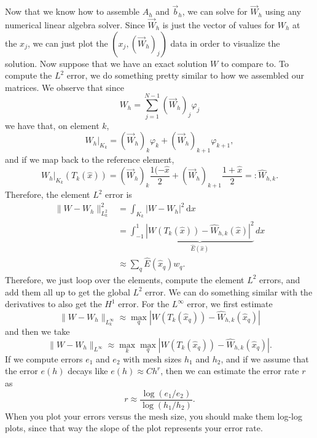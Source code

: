 \documentclass{article}
\theoremstyle{definition}
\theoremstyle{plain}
\begin{document}
Now that we know how to assemble $A_h$ and $\vec b_h$, we can solve for $\vec W_h$ using any numerical linear algebra solver.
Since $\vec W_h$ is just the vector of values for $W_h$ at the $x_j$, we can just plot the $(x_j, (\vec W_h)_j)$ data in order to visualize the solution.
Now suppose that we have an exact solution $W$ to compare to.
To compute the $L^2$ error, we do something pretty similar to how we assembled our matrices.
We observe that since 
\begin{equation}
  W_h = \sum_{j=1}^{N-1}(\vec W_h)_j\varphi_j
\end{equation}
we have that, on element $k$,
\begin{equation}
  W_h|_{K_k} = (\vec W_h)_k\varphi_k + (\vec W_h)_{k+1}\varphi_{k+1},
\end{equation}
and if we map back to the reference element,
\begin{equation}
  W_h|_{K_k}(T_k(\widehat x)) = (\vec W_h)_k\frac{1(-\widehat x}{2} + (\vec W_h)_{k+1}\frac{1+\widehat x}{2} =: \widehat W_{h,k}.
\end{equation}
Therefore, the element $L^2$ error is 
\begin{align}
  \|W - W_h\|_{L^2_k}^2 & = \int_{K_k}|W-W_h|^2\,\mathrm dx \\ 
                        & = \int_{-1}^1 \underbrace{|W(T_k(\widehat x)) - \widehat W_{h,k}(\widehat x)|^2}_{\widehat E(\widehat x)}\mathrm\, dx \\
                        & \approx \sum_q \widehat E(\widehat x_q) w_q.
\end{align}
Therefore, we just loop over the elements, compute the element $L^2$ errors, and add them all up to get the global $L^2$ error.
We can do something similar with the derivatives to also get the $H^1$ error.
For the $L^\infty$ error, we first estimate
\begin{equation}
  \|W-W_h\|_{L^\infty_k} \approx \max_q |W(T_k(\widehat x_q)) - \widehat W_{h,k}(\widehat x_q)|
\end{equation}
and then we take 
\begin{equation}
  \|W-W_h\|_{L^\infty} \approx \max_k\max_q |W(T_k(\widehat x_q)) - \widehat W_{h,k}(\widehat x_q)|.
\end{equation}
If we compute errors $e_1$ and $e_2$ with mesh sizes $h_1$ and $h_2$, and if we assume that the error $e(h)$ decays like $e(h) \approx Ch^r$, then we can estimate the error rate $r$ as 
\begin{equation}
  r \approx \frac{\log(e_1/e_2)}{\log(h_1/h_2)}.
\end{equation}
When you plot your errors versus the mesh size, you should make them log-log plots, since that way the slope of the plot represents your error rate.
\end{document}
